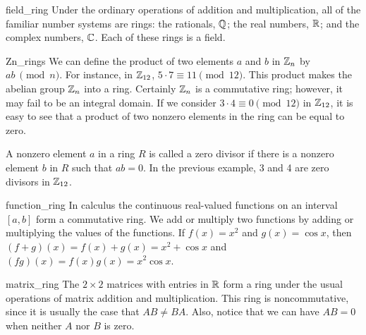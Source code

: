  
\begin{example}{field_ring}
Under the ordinary operations of addition and multiplication, all of
the familiar number systems are rings: the rationals, ${\Bbb Q}$; the
real numbers, ${\Bbb R}$; and the complex numbers, ${\Bbb C}$. Each of
these rings is a field. 
\end{example}
 
 
\begin{example}{Zn_rings}
We can define the product of two elements $a$ and $b$ in ${\Bbb Z}_n$
by $ab~\pmod{n}$. For instance, in ${\Bbb Z}_{12}$,  $5 \cdot 7 \equiv
11 \pmod{12}$.  This product makes the abelian group ${\Bbb Z}_n$ into
a ring. Certainly ${\Bbb Z}_n$ is a commutative ring; however, it may
fail to be an integral domain.  If we consider $3 \cdot 4 \equiv 0
\pmod{12}$ in ${\Bbb Z}_{12}$, it is easy to see that a product of two 
nonzero elements in the ring can be equal to zero.  
\end{example}

 
 
A nonzero element $a$ in a ring $R$ is called a {\bfi zero
divisor\/} if there is a nonzero element $b$ in $R$
such that $ab = 0$. In the previous example,  3 and 4 are zero
divisors in ${\Bbb Z}_{12}$.  
 
 
\begin{example}{function_ring}
In calculus the continuous real-valued functions on an interval
$[a,b]$ form a commutative ring. We add or multiply two functions by 
adding or multiplying the values of the functions.  If $f(x) = x^2$ and
$g(x) = \cos x$, then $(f+g)(x) = f(x) + g(x) = x^2 + \cos x$ and
$(fg)(x) = f(x) g(x) = x^2 \cos x$.
\mbox{\hspace{1in}}
\end{example}
 
 
\begin{example}{matrix_ring}
The $2 \times 2$ matrices  with entries in ${\Bbb R}$ form a ring
under the usual operations of matrix addition and multiplication. This
ring is \mbox{noncommutative}, since it is usually the case that $AB \neq
BA$. Also, notice that we can have $AB = 0$ when neither $A$ nor $B$
is zero. 
\end{example}
 
